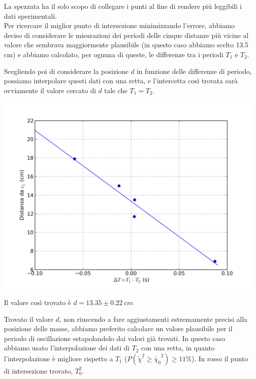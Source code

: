 La spezzata ha il solo scopo di collegare i punti al fine di rendere più leggibili i dati sperimentali.\\

Per ricercare il miglior punto di intersezione minimizzando l'errore, abbiamo deciso di considerare le misurazioni dei periodi delle cinque distanze più vicine al valore che sembrava maggiormente plausibile (in questo caso abbiamo scelto 13.5 cm) e abbiamo calcolato, per ognuna di queste, le differenze tra i periodi $T_1$ e $T_2$.

Scegliendo poi di considerare la posizione $d$ in funzione delle differenze di periodo, possiamo interpolare questi dati con una retta, e l'intercetta così trovata sarà ovviamente il valore cercato di $d$ tale che $T_1 = T_2$.

\begin{center}
\includegraphics[scale=0.60]{../grafici/kater/intercetta.png}
\end{center}
Il valore così trovato è $d = 13.35 \pm 0.22\ cm$

Trovato il valore $d$, non riuscendo a fare aggiustamenti estremamente precisi alla posizione delle masse, abbiamo preferito calcolare un valore plausibile per il periodo di oscillazione estapolandolo dai valori già trovati. In questo caso abbiamo usato l'interpolazione dei dati di $T_2$ con una retta, in quanto l'interpolazione è migliore rispetto a $T_1$ ($P(\tilde{\chi}^2 \geq \tilde{\chi_0}^2) \geq 11\%$).
In rosso il punto di intersezione trovato, $T^2_0$.

